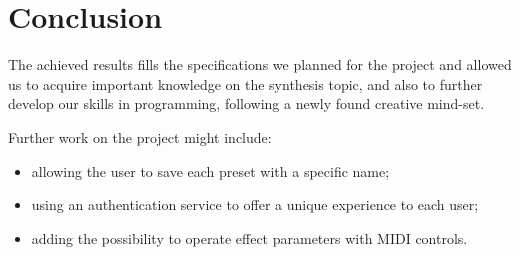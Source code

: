 \documentclass[12pt, a4paper]{article}
\begin{document}
\section{Conclusion}
The achieved results fills the specifications we planned for the project and allowed us to acquire important knowledge on the synthesis topic, and also to further develop our skills in programming, following a newly found creative mind-set. 

Further work on the project might include: 
\begin{itemize}
    \item allowing the user to save each preset with a specific name;
    \item using an authentication service to offer a unique experience to each user;
    \item adding the possibility to operate effect parameters with MIDI controls.
\end{itemize}
\end{document}

